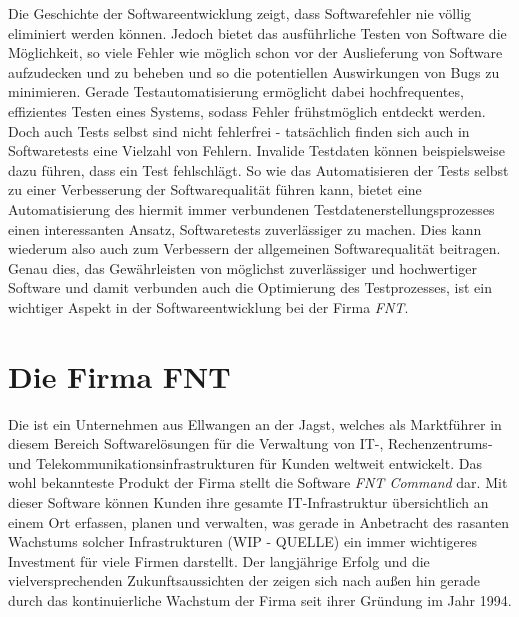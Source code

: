 Die Geschichte der Softwareentwicklung zeigt, dass Softwarefehler nie völlig eliminiert werden können. Jedoch bietet das ausführliche Testen von Software die Möglichkeit, so viele Fehler wie möglich schon vor der Auslieferung von Software aufzudecken und zu beheben und so die potentiellen Auswirkungen von Bugs zu minimieren. Gerade Testautomatisierung ermöglicht dabei hochfrequentes, effizientes Testen eines Systems, sodass Fehler frühstmöglich entdeckt werden. Doch auch Tests selbst sind nicht fehlerfrei - tatsächlich finden sich auch in Softwaretests eine Vielzahl von Fehlern. \cite{vahabzadeh:2015} Invalide Testdaten können beispielsweise dazu führen, dass ein Test fehlschlägt. So wie das Automatisieren der Tests selbst zu einer Verbesserung der Softwarequalität führen kann, bietet eine Automatisierung des hiermit immer verbundenen Testdatenerstellungsprozesses einen interessanten Ansatz, Softwaretests zuverlässiger zu machen. Dies kann wiederum also auch zum Verbessern der allgemeinen Softwarequalität beitragen. Genau dies, das Gewährleisten von möglichst zuverlässiger und hochwertiger Software und damit verbunden auch die Optimierung des Testprozesses, ist ein wichtiger Aspekt in der Softwareentwicklung bei der Firma \textit{FNT}. 

\section{Die Firma FNT}\label{sec:fnt}
Die \textit{\companyName{}} ist ein Unternehmen aus Ellwangen an der Jagst, welches als Marktführer in diesem Bereich Softwarelösungen für die Verwaltung von IT-, Rechenzentrums- und Telekommunikationsinfrastrukturen für Kunden weltweit entwickelt. \cite{fnt:2021} Das wohl bekannteste Produkt der Firma stellt die Software \textit{FNT Command} dar. Mit dieser Software können Kunden ihre gesamte IT-Infrastruktur übersichtlich an einem Ort erfassen, planen und verwalten, was gerade in Anbetracht des rasanten Wachstums solcher Infrastrukturen (WIP - QUELLE) ein immer wichtigeres Investment für viele Firmen darstellt. Der langjährige Erfolg und die vielversprechenden Zukunftsaussichten der \textit{\companyName{}} zeigen sich nach außen hin gerade durch das kontinuierliche Wachstum der Firma seit ihrer Gründung im Jahr 1994.

